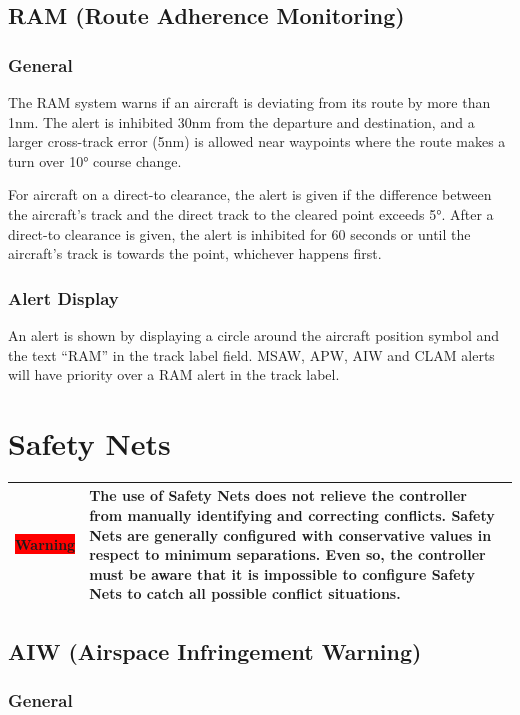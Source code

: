 \documentclass[a4paper,oneside,11pt]{memoir}
\newcommand{\tagref}[1]{\textit{\hyperref[#1]{\StrDel{#1}{tag:}}}}
\newcommand{\warn}[1]{
  \begin{center}
    
    \begin{tabular}{| P{1.5cm}|p{10.5cm} |}
      \hline
      \cellcolor{shadecolor}\colorbox{red}{\color{white}Warning} &\cellcolor{shadecolor} #1 \\ \hline
    \end{tabular}
  \end{center}
}
\begin{document}
\subsection{RAM (Route Adherence Monitoring)}
\label{tool:RAM}
\subsubsection*{General}

The RAM system warns if an aircraft is deviating from its route by more than 1nm. The alert is inhibited 30nm from the departure and destination, and a larger cross-track error (5nm) is allowed near waypoints where the route makes a turn over 10° course change.

\bigskip

For aircraft on a direct-to clearance, the alert is given if the difference between the aircraft’s track and the direct track to the cleared point exceeds 5°. After a direct-to clearance is given, the alert is inhibited for 60 seconds or until the aircraft’s track is towards the point, whichever happens first.

\subsubsection*{Alert Display}

An alert is shown by displaying a circle around the aircraft position symbol and the text “RAM” in the \tagref{tag:ALRT} track label field. MSAW, APW, AIW and CLAM alerts will have priority over a RAM alert in the track label.

\section{Safety Nets}

\warn{The use of Safety Nets does not relieve the controller from manually identifying and correcting conflicts. Safety Nets are generally configured with conservative values in respect to minimum separations. Even so, the controller must be aware that it is impossible to configure Safety Nets to catch all possible conflict situations.}


\subsection{AIW (Airspace Infringement Warning)}
\label{tool:AIW}
\subsubsection*{General}
\end{document}
